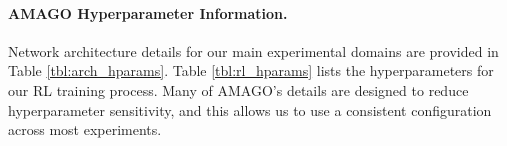 \documentclass{article}
\begin{document}
\paragraph{AMAGO Hyperparameter Information.} Network architecture details for our main experimental domains are provided in Table \ref{tbl:arch_hparams}. Table \ref{tbl:rl_hparams} lists the hyperparameters for our RL training process. Many of AMAGO's details are designed to reduce hyperparameter sensitivity, and this allows us to use a consistent configuration across most experiments.
\begin{table}[h]
\end{table}
\end{document}

